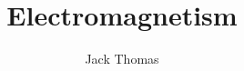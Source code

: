 \documentclass[]{report}
\begin{document}
\title{Electromagnetism}
\author{Jack Thomas}
\date{}

\maketitle
\newpage

\tableofcontents
\newpage
\end{document}
